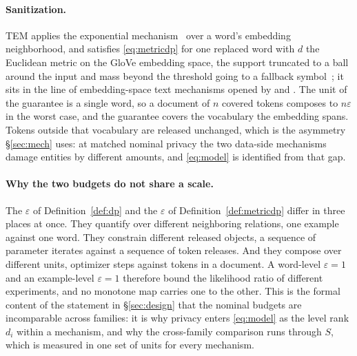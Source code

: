 \paragraph{Sanitization.}
TEM applies the exponential mechanism~\citep{mcsherry2007mechanism} over a word's embedding neighborhood,
and satisfies \eqref{eq:metricdp} for one replaced word with $d$ the Euclidean metric on the GloVe embedding space,
the support truncated to a ball around the input and mass beyond the threshold going to a fallback symbol~\citep{carvalho2021tem};
it sits in the line of embedding-space text mechanisms opened by \citet{feyisetan2020privacy} and \citet{yue2021differential}.
The unit of the guarantee is a single word,
so a document of $n$ covered tokens composes to $n \varepsilon$ in the worst case,
and the guarantee covers the vocabulary the embedding spans.
Tokens outside that vocabulary are released unchanged,
which is the asymmetry \S\ref{sec:mech} uses:
at matched nominal privacy the two data-side mechanisms damage entities by different amounts,
and \eqref{eq:model} is identified from that gap.

\paragraph{Why the two budgets do not share a scale.}
The $\varepsilon$ of Definition~\ref{def:dp} and the $\varepsilon$ of Definition~\ref{def:metricdp} differ in three places at once.
They quantify over different neighboring relations,
one example against one word.
They constrain different released objects,
a sequence of parameter iterates against a sequence of token releases.
And they compose over different units,
optimizer steps against tokens in a document.
A word-level $\varepsilon = 1$ and an example-level $\varepsilon = 1$ therefore bound the likelihood ratio of different experiments,
and no monotone map carries one to the other.
This is the formal content of the statement in \S\ref{sec:design} that the nominal budgets are incomparable across families:
it is why privacy enters \eqref{eq:model} as the level rank $d_i$ within a mechanism,
and why the cross-family comparison runs through $S$,
which is measured in one set of units for every mechanism.

